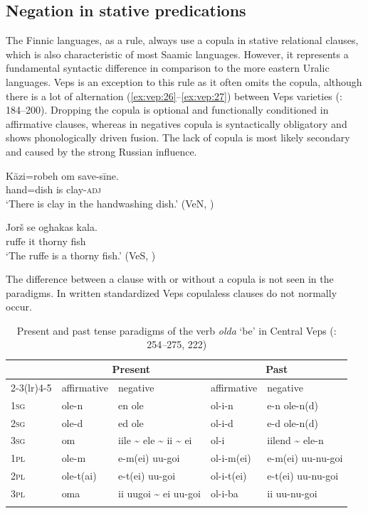 \documentclass[output=paper,colorlinks=true, citecolor=brown]{langscibook}
\begin{document}
\subsection{Negation in stative predications}\label{sec:vep:2.3}

The Finnic languages, as a rule, always use a copula in stative relational clauses, which is also characteristic of most Saamic languages. However, it represents a fundamental syntactic difference in comparison to the more eastern Uralic languages. Veps is an exception to this rule as it often omits the copula, although there is a lot of alternation (\ref{ex:vep:26}–\ref{ex:vep:27}) between Veps varieties (\citealt{Grünthal2015}: 184–200). Dropping the copula is optional and functionally conditioned in affirmative clauses, whereas in negatives copula is syntactically obligatory and shows phonologically driven fusion. The lack of copula is most likely secondary and caused by the strong Russian influence.

\ea
    \label{ex:vep:26}
    \gll Käzi=robeh om save-sīne.\\
         hand=dish is clay-\textsc{adj}\\
    \glt ‘There is clay in the handwashing dish.’ (VeN, \citealt[72]{MSFOu86})
\z 

\ea
    \label{ex:vep:27}
    \gll Jorš se oghakas kala. \\
         ruffe it thorny fish\\
    \glt ‘The ruffe is a thorny fish.’ (VeS, \citealt[70]{MSFOu86})
\z
    
The difference between a clause with or without a copula is not seen in the paradigms. In written standardized Veps copulaless clauses do not normally occur.

\begin{table}
    \centering
\begin{tabularx}{\textwidth}{Xllll}
\lsptoprule
& \multicolumn{2}{c}{Present}   & \multicolumn{2}{c}{Past}  \\
\cmidrule(lr){2-3}\cmidrule(lr){4-5}
& {affirmative}  & {negative} & {affirmative}  & {negative}\\
\midrule
\textsc{1sg} & ole-n & en ole & ol-i-n & e-n ole-n(d)\\
\textsc{2sg} & ole-d & ed ole & ol-i-d & e-d ole-n(d)\\
\textsc{3sg} & om & iile {\textasciitilde} ele {\textasciitilde} ii {\textasciitilde} ei & ol-i & iilend {\textasciitilde} ele-n\\
\textsc{1pl} & ole-m & e-m(ei) uu-goi & ol-i-m(ei) & e-m(ei) uu-nu-goi\\
\textsc{2pl} & ole-t(ai) & e{}-t(ei) uu{}-goi & ol-i-t(ei) & e-t(ei) uu-nu-goi\\
\textsc{3pl} & oma & ii uugoi {\textasciitilde} ei uu-goi & ol-i-ba & ii uu-nu-goi\\
\lspbottomrule
\end{tabularx}
\caption{Present and past tense paradigms of the verb \textit{olda} ‘be’  in Central Veps (\citealt{Zaitseva2001}: 254\textit{–}275, 222)}
\label{tab:vep:5}
\end{table}
\end{document}
